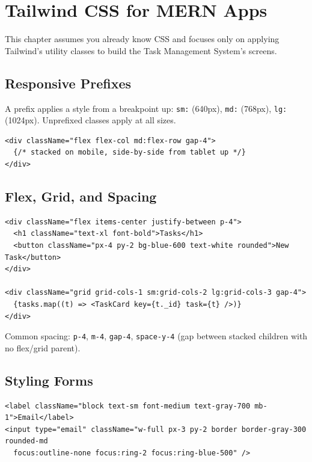 \chapter{Tailwind CSS for MERN Apps}

\begin{notebox}[NOTE]
This chapter assumes you already know CSS and focuses only on applying
Tailwind's utility classes to build the Task Management System's screens.
\end{notebox}

\section{Responsive Prefixes}

A prefix applies a style from a breakpoint up: \texttt{sm:} (640px),
\texttt{md:} (768px), \texttt{lg:} (1024px). Unprefixed classes apply at
all sizes.

\begin{lstlisting}
<div className="flex flex-col md:flex-row gap-4">
  {/* stacked on mobile, side-by-side from tablet up */}
</div>
\end{lstlisting}

\section{Flex, Grid, and Spacing}

\begin{lstlisting}
<div className="flex items-center justify-between p-4">
  <h1 className="text-xl font-bold">Tasks</h1>
  <button className="px-4 py-2 bg-blue-600 text-white rounded">New Task</button>
</div>

<div className="grid grid-cols-1 sm:grid-cols-2 lg:grid-cols-3 gap-4">
  {tasks.map((t) => <TaskCard key={t._id} task={t} />)}
</div>
\end{lstlisting}

Common spacing: \texttt{p-4}, \texttt{m-4}, \texttt{gap-4},
\texttt{space-y-4} (gap between stacked children with no flex/grid parent).

\section{Styling Forms}

\begin{lstlisting}
<label className="block text-sm font-medium text-gray-700 mb-1">Email</label>
<input type="email" className="w-full px-3 py-2 border border-gray-300 rounded-md
  focus:outline-none focus:ring-2 focus:ring-blue-500" />
\end{lstlisting}

